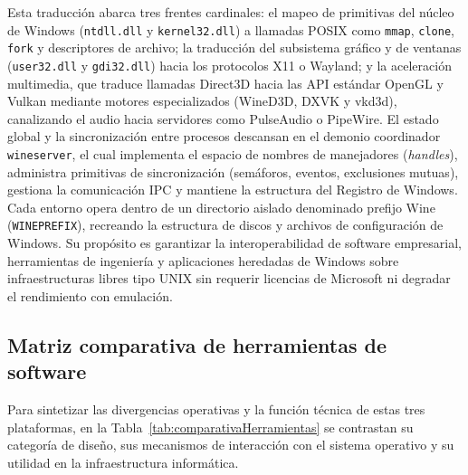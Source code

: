 \documentclass[12pt]{article}
\begin{document}
Esta traducción abarca tres frentes cardinales: el mapeo de primitivas del núcleo de Windows (\texttt{ntdll.dll} y \texttt{kernel32.dll}) a llamadas POSIX como \texttt{mmap}, \texttt{clone}, \texttt{fork} y descriptores de archivo; la traducción del subsistema gráfico y de ventanas (\texttt{user32.dll} y \texttt{gdi32.dll}) hacia los protocolos X11 o Wayland; y la aceleración multimedia, que traduce llamadas Direct3D hacia las API estándar OpenGL y Vulkan mediante motores especializados (WineD3D, DXVK y vkd3d), canalizando el audio hacia servidores como PulseAudio o PipeWire. El estado global y la sincronización entre procesos descansan en el demonio coordinador \texttt{wineserver}, el cual implementa el espacio de nombres de manejadores (\textit{handles}), administra primitivas de sincronización (semáforos, eventos, exclusiones mutuas), gestiona la comunicación IPC y mantiene la estructura del Registro de Windows. Cada entorno opera dentro de un directorio aislado denominado prefijo Wine (\texttt{WINEPREFIX}), recreando la estructura de discos y archivos de configuración de Windows. Su propósito es garantizar la interoperabilidad de software empresarial, herramientas de ingeniería y aplicaciones heredadas de Windows sobre infraestructuras libres tipo UNIX sin requerir licencias de Microsoft ni degradar el rendimiento con emulación.

\subsection{Matriz comparativa de herramientas de software}
\label{sec:comparativaHerramientas}

Para sintetizar las divergencias operativas y la función técnica de estas tres plataformas, en la Tabla~\ref{tab:comparativaHerramientas} se contrastan su categoría de diseño, sus mecanismos de interacción con el sistema operativo y su utilidad en la infraestructura informática.
\end{document}
